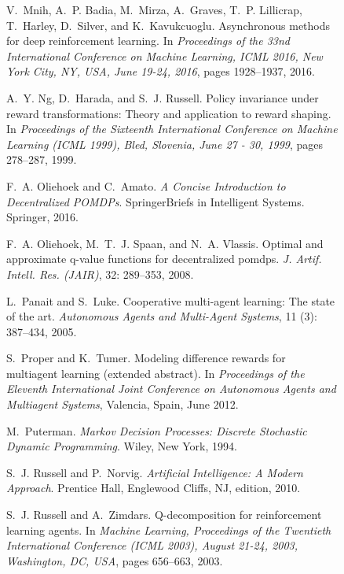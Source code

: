 \documentclass{article}
\begin{document}
\begin{SCfigure}
\begin{thebibliography}{40}
V.~Mnih, A.~P. Badia, M.~Mirza, A.~Graves, T.~P. Lillicrap, T.~Harley,
  D.~Silver, and K.~Kavukcuoglu.
\newblock Asynchronous methods for deep reinforcement learning.
\newblock In \emph{Proceedings of the 33nd International Conference on Machine
  Learning, {ICML} 2016, New York City, NY, USA, June 19-24, 2016}, pages
  1928--1937, 2016.

A.~Y. Ng, D.~Harada, and S.~J. Russell.
\newblock Policy invariance under reward transformations: Theory and
  application to reward shaping.
\newblock In \emph{Proceedings of the Sixteenth International Conference on
  Machine Learning {(ICML} 1999), Bled, Slovenia, June 27 - 30, 1999}, pages
  278--287, 1999.

F.~A. Oliehoek and C.~Amato.
\newblock \emph{A Concise Introduction to Decentralized POMDPs}.
\newblock SpringerBriefs in Intelligent Systems. Springer, 2016.

F.~A. Oliehoek, M.~T.~J. Spaan, and N.~A. Vlassis.
\newblock Optimal and approximate q-value functions for decentralized pomdps.
\newblock \emph{J. Artif. Intell. Res. {(JAIR)}}, 32: 289--353, 2008.

L.~Panait and S.~Luke.
\newblock Cooperative multi-agent learning: The state of the art.
\newblock \emph{Autonomous Agents and Multi-Agent Systems}, 11
  (3): 387--434, 2005.

S.~Proper and K.~Tumer.
\newblock Modeling difference rewards for multiagent learning (extended
  abstract).
\newblock In \emph{Proceedings of the Eleventh International Joint Conference
  on Autonomous Agents and Multiagent Systems}, Valencia, Spain, June 2012.

M.~Puterman.
\newblock \emph{{Markov} Decision Processes: Discrete Stochastic Dynamic
  Programming}.
\newblock Wiley, New York, 1994.

S.~J. Russell and P.~Norvig.
\newblock \emph{Artificial Intelligence: A Modern Approach}.
\newblock Prentice Hall, Englewood Cliffs, NJ,  edition, 2010.

S.~J. Russell and A.~Zimdars.
\newblock Q-decomposition for reinforcement learning agents.
\newblock In \emph{Machine Learning, Proceedings of the Twentieth International
  Conference {(ICML} 2003), August 21-24, 2003, Washington, DC, {USA}}, pages
  656--663, 2003.


\end{thebibliography}
\end{SCfigure}
\end{document}
